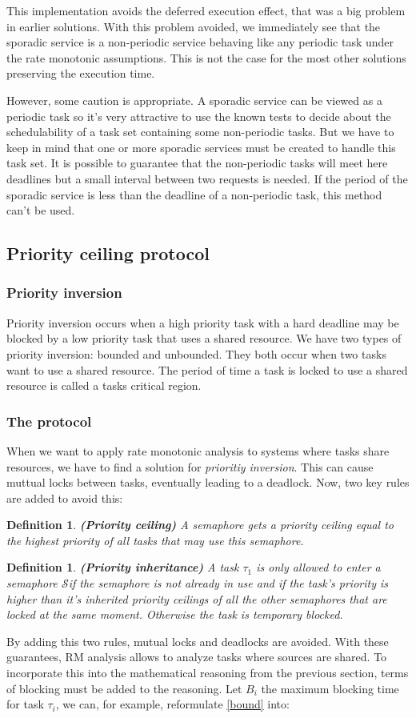 \documentclass[a4paper,12pt]{article}
\newtheorem{definition}[theorem]{Definition}
\theoremstyle{definition}
\begin{document}
This 
implementation avoids the deferred execution effect, that was a big problem in 
earlier solutions.  With this 
problem avoided, we immediately see that the sporadic service is a non-periodic 
service behaving like any periodic task under the rate monotonic assumptions. 
This is not the case for the most other solutions preserving the execution time.

However, some caution is appropriate. A sporadic service can be viewed as 
a periodic task so it's very attractive to use the known tests to decide about the 
schedulability of a task set containing some non-periodic tasks. But we have to 
keep in mind that one or more sporadic services must be created to handle this task set. It is possible to 
guarantee that the non-periodic tasks will meet here deadlines but a small interval between two requests is needed. 
If the period of the sporadic service is less than the deadline of a non-periodic task, this method can't be used.  

\subsection{Priority ceiling protocol}
\subsubsection{Priority inversion}
Priority inversion occurs when a high priority 
task with a hard deadline may be blocked by a low priority task that uses a 
shared resource. We have two types of priority inversion: bounded and unbounded. 
They both occur when two tasks want to use a shared resource. The period of time 
a task is locked to use a shared resource is called a tasks critical region. 
\subsubsection{The protocol}
When we want to apply rate monotonic analysis to systems where tasks share 
resources, we have to find a solution for  \emph{prioritiy inversion}. This can cause 
muttual locks between tasks, eventually leading to a deadlock. Now, two key 
rules are added to avoid this:
\begin{definition}\textbf{(Priority ceiling)}
A semaphore gets a \emph{priority ceiling} equal to the highest priority of all tasks that 
may use this semaphore. 
\end{definition}
\begin{definition}\textbf{(Priority inheritance)}
A task $\tau_1$ is only allowed to enter a semaphore $\mathcal{S}$if the semaphore is not 
already in use and if the task's priority is higher than it's inherited priority ceilings 
of all the other semaphores that are locked at the same moment. Otherwise the 
task is temporary blocked.
\end{definition}
By adding this two rules, mutual locks and deadlocks are avoided. With these 
guarantees, RM analysis allows to analyze tasks where sources are shared. To 
incorporate this into the mathematical reasoning from the previous section, 
terms of blocking must be added to the reasoning. Let $B_i$ the maximum blocking 
time for task $\tau_i$, we can, for example, reformulate \ref{bound} into:
\end{document}
